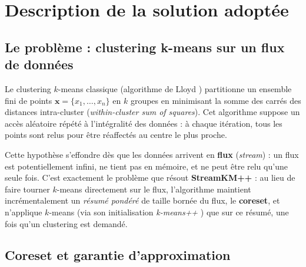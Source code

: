 \section{Description de la solution adoptée}
\label{sec:solution}

\subsection{Le problème : clustering k-means sur un flux de données}

Le clustering $k$-means classique (algorithme de Lloyd \cite{lloyd1982})
partitionne un ensemble fini de points $\mathbf{x} = \{x_1,\dots,x_n\}$ en $k$
groupes en minimisant la somme des carrés des distances intra-cluster
(\emph{within-cluster sum of squares}). Cet algorithme suppose un accès
aléatoire répété à l'intégralité des données : à chaque itération, tous les
points sont relus pour être réaffectés au centre le plus proche.

Cette hypothèse s'effondre dès que les données arrivent en \textbf{flux}
(\emph{stream}) : un flux est potentiellement infini, ne tient pas en
mémoire, et ne peut être relu qu'une seule fois. C'est exactement le problème
que résout \textbf{StreamKM++} \cite{ackermann2012} : au lieu de faire
tourner $k$-means directement sur le flux, l'algorithme maintient
incrémentalement un \emph{résumé pondéré} de taille bornée du flux, le
\textbf{coreset}, et n'applique $k$-means (via son initialisation
\emph{k-means++} \cite{arthur2007}) que sur ce résumé, une fois qu'un
clustering est demandé.

\subsection{Coreset et garantie d'approximation}

